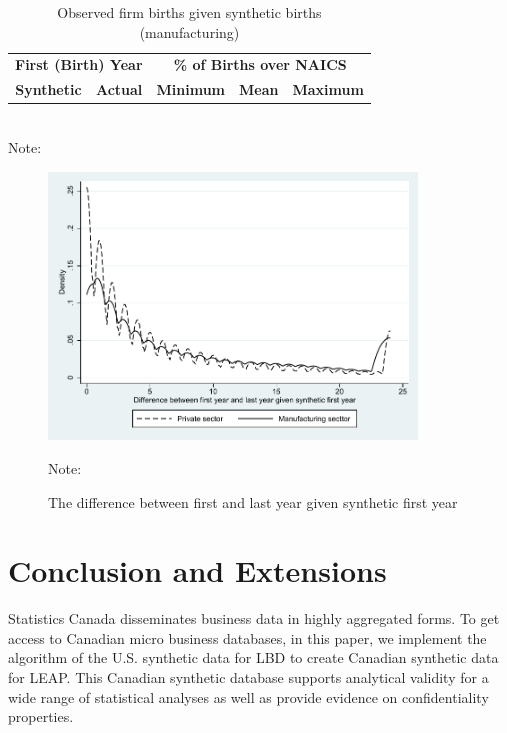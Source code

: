 \documentclass{article}
\begin{document}
\begin{table}[H]
\centering\footnotesize
\caption{Observed firm births given synthetic births (manufacturing)} \label{ProbabilityManufacturing} \medskip
\renewcommand{\arraystretch}{1}
\begin{tabular}{c c| c c c}
\toprule
\multicolumn{2}{c|}{\textbf{First (Birth) Year}} &  \multicolumn{3}{c}{\textbf{\% of Births over NAICS}}\\
\textbf{Synthetic}&\textbf{Actual}&\textbf{Minimum}&\textbf{Mean}&\textbf{Maximum}\\
\midrule

\bottomrule
\end{tabular} 
\\
\justify
Note:
\end{table}



\begin{figure} [H]
\centering
\caption{The difference between first and last year given synthetic first year} \label{SyntheticFirstYear}
\includegraphics[height=2.8in, width=.7\linewidth]{graphs/The_difference_between_first_and_last_year_given_synthetic_first_year_bw.pdf} 
\begin{minipage}{0.85\textwidth}
{\footnotesize Note:  \par}
\end{minipage}
\end{figure}



\section{Conclusion and Extensions}
Statistics Canada disseminates business data in highly aggregated forms. To get access to Canadian micro business databases, in this paper, we implement the algorithm of the U.S. synthetic data for LBD to create Canadian synthetic data for LEAP. This Canadian synthetic database supports analytical validity for a wide range of statistical analyses as well as provide evidence on confidentiality properties.
\end{document}
